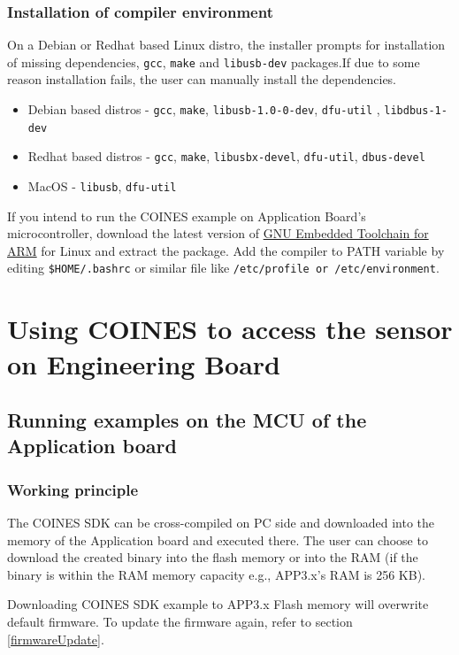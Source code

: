 \documentclass[11pt,headings=small]{scrartcl}
\begin{document}
\subsubsection{Installation of compiler environment}

On a Debian or Redhat based Linux distro, the installer prompts for installation of missing dependencies, \texttt{gcc}, \texttt{make} and \texttt{libusb-dev} packages.If due to some reason installation fails, the user can manually install the dependencies.
\begin{itemize}
\item Debian based distros - \texttt{gcc}, \texttt{make}, \texttt{libusb-1.0-0-dev}, \texttt{dfu-util} , \texttt{libdbus-1-dev}
\item Redhat based distros - \texttt{gcc}, \texttt{make}, \texttt{libusbx-devel}, \texttt{dfu-util}, \texttt{dbus-devel}
\item MacOS - 
\texttt{libusb}, \texttt{dfu-util}
\end{itemize}

If you intend to run the COINES example on Application Board's microcontroller, download the latest version of \href{https://developer.arm.com/downloads/-/arm-gnu-toolchain-downloads}{GNU Embedded Toolchain for ARM} for Linux and extract the package. Add the compiler to PATH variable by editing \texttt{\$HOME/.bashrc} or similar file like \texttt{/etc/profile or /etc/environment}.

\section{Using COINES to access the sensor on Engineering Board} \label{coines}

\subsection{Running examples on the MCU of the Application board}\label{ExampleOnMCU}
\subsubsection{Working principle}
The COINES SDK can be cross-compiled on PC side and downloaded into the memory of the Application board and executed there. The user can choose to download the created binary into the flash memory or into the RAM (if the binary is within the RAM memory capacity e.g., APP3.x's RAM is 256 KB).

Downloading COINES SDK example to APP3.x Flash memory will overwrite default firmware. To update the firmware again, refer to section \ref{firmwareUpdate}.
\end{document}
